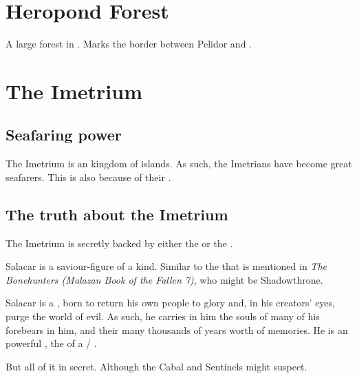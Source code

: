 \section{Heropond Forest}
\label{Heropond Forest}
A large forest in \PelidorContinent. Marks the border between Pelidor and \Scyrum. 















\section{The Imetrium}
\label{Imetrium}
\label{Imetric}









\subsection{Seafaring power}
The Imetrium is an kingdom of islands. 
As such, the Imetrians have become great seafarers. 
This is also because of their . 









\subsection{The truth about the Imetrium}
The Imetrium is secretly backed by either the \nagae{} or the \cuezcans. 

Salacar is a saviour-figure of a kind. Similar to the \human{}  that is mentioned in \emph{The Bonehunters (Malazan Book of the Fallen 7)}, who might be Shadowthrone. 

Salacar is a , born to return his own people to glory and, in his creators' eyes, purge the world of evil. As such, he carries in him the souls of many of his forebears in him, and their many thousands of years worth of memories. He is an powerful \vertex, the \apex{} of a \cuezcan/\naga{} \matrixx. 

But all of it in secret. Although the Cabal and Sentinels might suspect.







